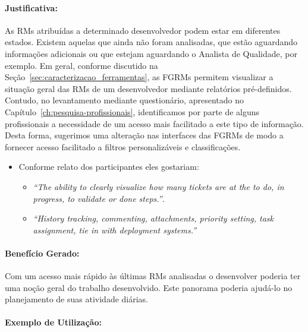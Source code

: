 
\paragraph{Justificativa:}
\label{par:justificativa_s04}

As RMs atribuídas a determinado desenvolvedor podem estar em diferentes estados.
Existem aquelas que ainda não foram analisadas, que estão aguardando informações
adicionais ou que estejam aguardando o Analista de Qualidade, por exemplo.  Em
geral, conforme discutido na Seção~\ref{sec:caracterizacao_ferramentas}, as
FGRMs permitem visualizar a situação geral das RMs de um desenvolvedor mediante
relatórios pré-definidos. Contudo, no levantamento mediante questionário,
apresentado no Capítulo~\ref{ch:pesquisa-profissionais}, identificamos por parte
de alguns profissionais a necessidade de um acesso mais facilitado a este tipo
de informação. Desta forma, sugerimos uma alteração nas interfaces das FGRMs de
modo a fornecer acesso facilitado a filtros personalizáveis e classificações.

\begin{itemize}
	\item Conforme relato dos participantes eles gostariam:
	\begin{itemize}
		\item \textit{``The ability to clearly visualize how many tickets are at
				the to do, in progress, to validate or done steps.''}.
		\item \textit{``History tracking, commenting, attachments, priority
				setting, task assignment, tie in with deployment systems.''}
	\end{itemize}
\end{itemize}

\paragraph{Benefício Gerado:}
\label{par:papéis_afetados_s04}

Com um acesso mais rápido às últimas RMs analisadas o desenvolver poderia ter
uma noção geral do trabalho desenvolvido. Este panorama poderia ajudá-lo no
planejamento de suas atividade diárias.

\paragraph{Exemplo de Utilização:}
\label{par:exemplo_de_utilização_s04}

